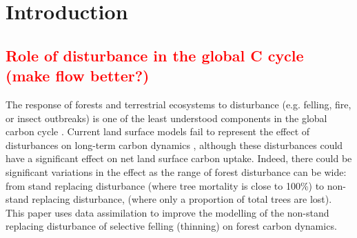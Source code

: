 \documentclass[draft,linenumbers]{agujournal}
\begin{document}
%
% 
% 
% 


\section{Introduction}

\subsection{\textcolor{red}{Role of disturbance in the global C cycle (make flow better?)}}
The response of forests and terrestrial ecosystems to disturbance (e.g. felling, fire, or insect outbreaks) is one of the least understood components in the global carbon cycle \citep{ciais2014carbon}. Current land surface models fail to represent the effect of disturbances on long-term carbon dynamics \citep{running2008ecosystem}, although these disturbances could have a significant effect on net land surface carbon uptake. Indeed, there could be significant variations in the effect as the range of forest disturbance can be wide: from stand replacing disturbance (where tree mortality is close to 100\%) to non-stand replacing disturbance, (where only a proportion of total trees are lost). This paper uses data assimilation to improve the modelling of the non-stand replacing disturbance of selective felling (thinning) on forest carbon dynamics.
\end{document}
